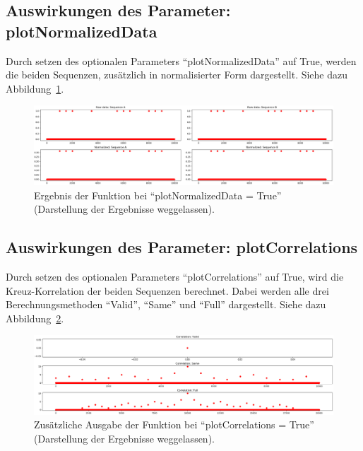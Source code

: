 \subsection{Auswirkungen des Parameter: plotNormalizedData}
Durch setzen des optionalen Parameters \enquote{plotNormalizedData} auf True, werden die beiden Sequenzen, zusätzlich in normalisierter Form dargestellt. 
Siehe dazu Abbildung~\ref{fig:correlationPlotNormalizedData}. 
\begin{figure}[H]
    \includegraphics[width=\linewidth]{pythonImplementation/images/correlationPlotNormalizedData.PNG}
    \caption[Ergebnis: plotNormalizedData]{Ergebnis der Funktion bei \enquote{plotNormalizedData = True} (Darstellung der Ergebnisse weggelassen)\footnotemark. }
    \label{fig:correlationPlotNormalizedData}
\end{figure}

\subsection{Auswirkungen des Parameter: plotCorrelations}
Durch setzen des optionalen Parameters \enquote{plotCorrelations} auf True, 
wird die Kreuz-Korrelation der beiden Sequenzen berechnet.
Dabei werden alle drei Berechnungsmethoden \enquote{Valid}, \enquote{Same} und \enquote{Full} dargestellt.
Siehe dazu Abbildung~\ref{fig:correlationPlotCorrelations}. 
\begin{figure}[H]
    \includegraphics[width=\linewidth]{pythonImplementation/images/correlationPlotCorrelations.PNG}
    \caption[Ergebnis: plotCorrelations]{Zusätzliche Ausgabe der Funktion bei \enquote{plotCorrelations = True} (Darstellung der Ergebnisse weggelassen)\footnotemark. }
    \label{fig:correlationPlotCorrelations}
\end{figure}

